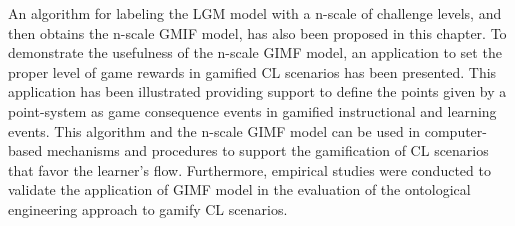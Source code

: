 An algorithm for labeling the LGM model with a n-scale of challenge levels, and then obtains the n-scale GMIF model, has also been proposed in this chapter.
To demonstrate the usefulness of the n-scale GIMF model, an application to set the proper level of game rewards in gamified CL scenarios has been presented.
This application has been illustrated providing support to define the points given by a point-system as game consequence events in gamified instructional and learning events.
This algorithm and the n-scale GIMF model can be used in computer-based mechanisms and procedures to support the gamification of CL scenarios that favor the learner's flow.
Furthermore, empirical studies were conducted to validate the application of GIMF model in the evaluation of the ontological engineering approach to gamify CL scenarios.
